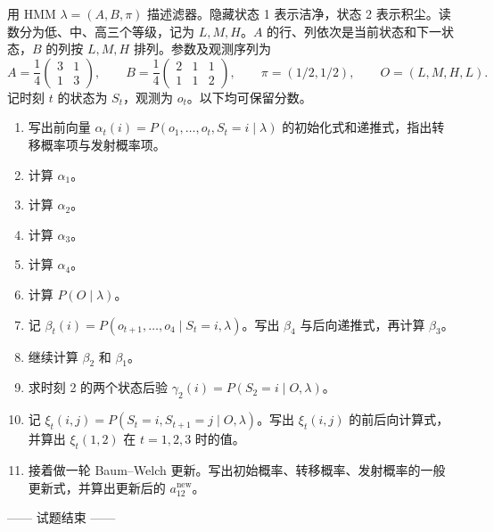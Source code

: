 用 HMM $\lambda=(A,B,\pi)$ 描述滤器。隐藏状态 1 表示洁净，状态 2 表示积尘。读数分为低、中、高三个等级，记为 $L,M,H$。$A$ 的行、列依次是当前状态和下一状态，$B$ 的列按 $L,M,H$ 排列。参数及观测序列为
\[
 A=\frac14\begin{pmatrix}3&1\\1&3\end{pmatrix},\qquad
 B=\frac14\begin{pmatrix}2&1&1\\1&1&2\end{pmatrix},\qquad
 \pi=(1/2,1/2),\qquad O=(L,M,H,L).
\]
记时刻 $t$ 的状态为 $S_t$，观测为 $o_t$。以下均可保留分数。
\begin{enumerate}[label=(\arabic*)]
\item 写出前向量 $\alpha_t(i)=P(o_1,\ldots,o_t,S_t=i\mid\lambda)$ 的初始化式和递推式，指出转移概率项与发射概率项。
\item 计算 $\alpha_1$。
\item 计算 $\alpha_2$。
\item 计算 $\alpha_3$。
\item 计算 $\alpha_4$。
\item 计算 $P(O\mid\lambda)$。
\item 记 $\beta_t(i)=P(o_{t+1},\ldots,o_4\mid S_t=i,\lambda)$。写出 $\beta_4$ 与后向递推式，再计算 $\beta_3$。
\item 继续计算 $\beta_2$ 和 $\beta_1$。
\item 求时刻 2 的两个状态后验 $\gamma_2(i)=P(S_2=i\mid O,\lambda)$。
\item 记 $\xi_t(i,j)=P(S_t=i,S_{t+1}=j\mid O,\lambda)$。写出 $\xi_t(i,j)$ 的前后向计算式，并算出 $\xi_t(1,2)$ 在 $t=1,2,3$ 时的值。
\item 接着做一轮 Baum--Welch 更新。写出初始概率、转移概率、发射概率的一般更新式，并算出更新后的 $a_{12}^{\mathrm{new}}$。
\end{enumerate}

\vfill \begin{center} —— 试题结束 ——\end{center}
